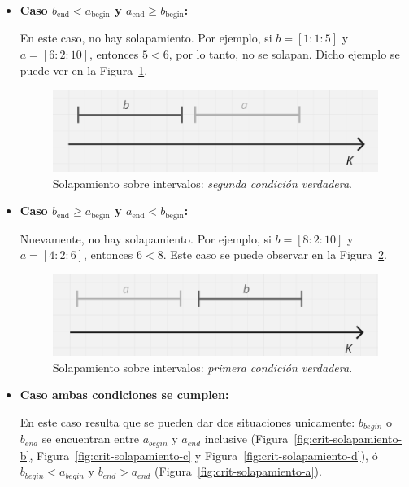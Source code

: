 \begin{itemize}
    \item \textbf{Caso $b_{\text{end}} < a_{\text{begin}}$ y $a_{\text{end}} \geq b_{\text{begin}}$:}

    En este caso, no hay solapamiento. Por ejemplo, si $b = [1:1:5]$ y $a = [6:2:10]$, entonces $5 < 6$, por lo tanto, no se solapan. Dicho ejemplo se puede ver en la Figura~\ref{fig:ej1}.

    \begin{figure}[h]
        \centering
        \includegraphics[width=0.75\linewidth]{figures/Optimazaciones/Interseccion/crit sol 10.png}
        \caption{Solapamiento sobre intervalos: \textit{segunda condición verdadera}.}
        \label{fig:ej1}
    \end{figure}

    \item \textbf{Caso $b_{\text{end}} \geq a_{\text{begin}}$ y $a_{\text{end}} < b_{\text{begin}}$:}

    Nuevamente, no hay solapamiento. Por ejemplo, si $b = [8:2:10]$ y $a = [4:2:6]$, entonces $6 < 8$. Este caso se puede observar en la Figura~\ref{fig:ej2}.

    \begin{figure}[h]
        \centering
        \includegraphics[width=0.75\linewidth]{figures/Optimazaciones/Interseccion/crit sol01.png}
        \caption{Solapamiento sobre intervalos: \textit{primera condición verdadera}.}
        \label{fig:ej2}
    \end{figure}

    \item \textbf{Caso ambas condiciones se cumplen:}

    En este caso resulta que se pueden dar dos situaciones unicamente: $b_{begin}$ o $b_{end}$ se encuentran entre $a_{begin}$ y $a_{end}$ inclusive (Figura~\ref{fig:crit-solapamiento-b}, Figura~\ref{fig:crit-solapamiento-c} y Figura~\ref{fig:crit-solapamiento-d}), ó $b_{begin} < a_{begin}$ y $b_{end}>a_{end}$ (Figura~\ref{fig:crit-solapamiento-a}).


\end{itemize}
